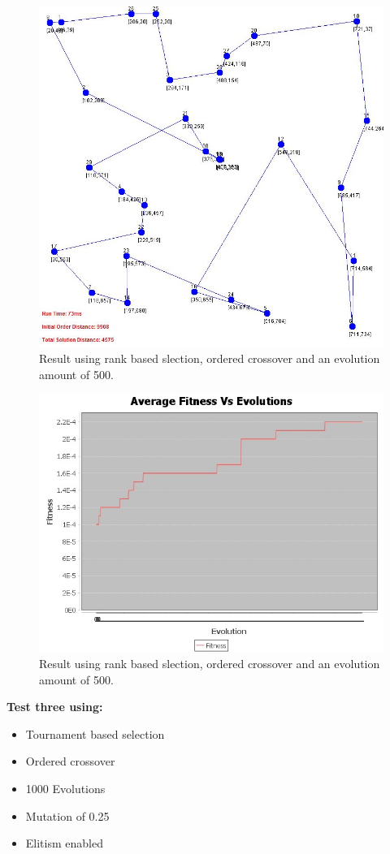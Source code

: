 \documentclass[article]{IEEEtran}
\begin{document}
\begin{figure}[H]
\centering
  \includegraphics[width=.8\linewidth]{images/test2}
  \caption{Result using rank based slection, ordered crossover and an evolution amount of 500.}
  \label{fig:16}
\end{figure}

\begin{figure}[H]
\centering
  \includegraphics[width=.8\linewidth]{images/averageFitnesses2}
  \caption{Result using rank based slection, ordered crossover and an evolution amount of 500.}
  \label{fig:17}
\end{figure}

\textbf{Test three using:} 
\begin{itemize}
\item Tournament based selection
\item Ordered crossover
\item 1000 Evolutions
\item Mutation of 0.25
\item Elitism enabled
\end{itemize} 
\end{document}
